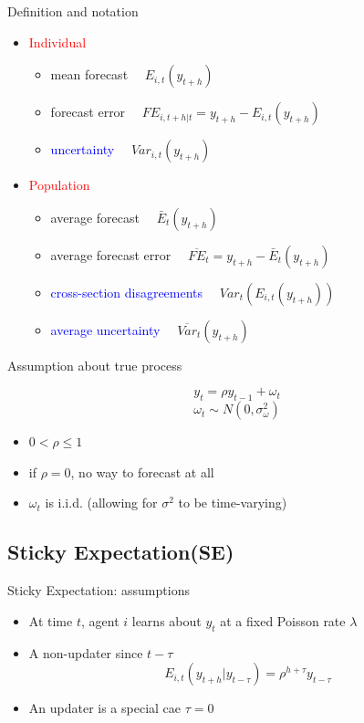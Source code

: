 \documentclass{beamer}
\begin{document}
\begin{frame}{Definition and notation}
\begin{itemize}
	\item \textcolor{red}{Individual}
	\begin{itemize}
		\item  mean forecast $\quad E_{i,t}(y_{t+h})$
		\item forecast error $\quad FE_{i,t+h|t} = y_{t+h}- E_{i,t}(y_{t+h})$
		\item \textcolor{blue}{uncertainty} $\quad Var_{i,t}(y_{t+h})$
	\end{itemize}
	\item \textcolor{red}{Population}
	\begin{itemize}
		\item average forecast  $\quad \bar E_{t}(y_{t+h})$
		\item average forecast error $\quad \overline {FE}_{t}= y_{t+h}-\bar E_{t}(y_{t+h})$
		\item \textcolor{blue}{cross-section disagreements}  $\quad Var_t(E_{i,t}(y_{t+h}))$
		\item \textcolor{blue}{average uncertainty}  $\quad \overline{Var}_t(y_{t+h})$
	\end{itemize}
\end{itemize}

\end{frame}


\begin{frame}{Assumption about true process}

$$y_{t} = \rho y_{t-1} + \omega_t  $$ 
$$\omega_t \sim N(0,\sigma^2_{\omega})$$

\begin{itemize}
	\item $0 < \rho \leq 1$
	\item if $\rho =0$, no way to forecast at all
	\item $\omega_t$ is i.i.d. (allowing for $\sigma^2$ to be time-varying) 
\end{itemize}

\end{frame}


\subsection{Sticky Expectation(SE)}


\begin{frame}{Sticky Expectation: assumptions}
\begin{itemize}
	\item At time $t$, agent $i$ learns about $y_t$ at a fixed Poisson rate $\lambda$ 
	\item A non-updater since $t-\tau$  
	$$E_{i,t}(y_{t+h}|y_{t-\tau}) =\rho^{h+\tau} y_{t-\tau} $$
	\item An updater is a special cae  $\tau=0$ 
\end{itemize}
\end{frame}
\end{document}
